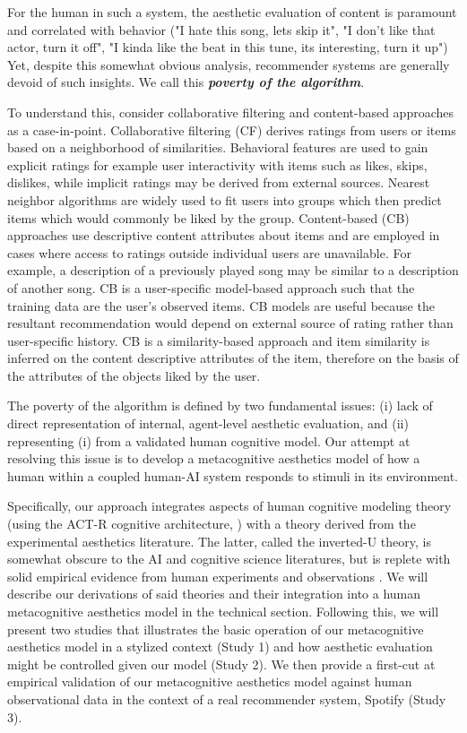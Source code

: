 \documentclass[letterpaper]{article} %
\begin{document}
For the human in such a system, the aesthetic evaluation of content is paramount and correlated with behavior ("I hate this song, lets skip it", "I don't like that actor, turn it off", "I kinda like the beat in this tune, its interesting, turn it up")  Yet, despite this somewhat obvious analysis, recommender systems are generally devoid of such insights.  We call this \textbf{\textit{poverty of the algorithm}}.  

To understand this, consider collaborative filtering and content-based approaches as a case-in-point.  Collaborative filtering (CF) derives ratings from users or items based on a neighborhood of similarities. Behavioral features are used to gain explicit ratings for example user interactivity with items such as likes, skips, dislikes, while implicit ratings may be derived from external sources.  Nearest neighbor algorithms are widely used to fit users into groups which then predict items which would commonly be liked by the group.  Content-based (CB) approaches use descriptive content attributes about items and are employed in cases where access to ratings outside individual users are unavailable. For example, a description of a previously played song may be similar to a description of another song. CB is a user-specific model-based approach such that the training data are the user’s observed items.  CB models are useful because the resultant recommendation would depend on external source of rating rather than user-specific history.  CB is a similarity-based approach and item similarity is inferred on the content descriptive attributes of the item, therefore on the basis of the attributes of the objects liked by the user. 

The poverty of the algorithm is defined by two fundamental issues: (i) lack of direct representation of internal, agent-level aesthetic evaluation, and (ii) representing (i) from a validated human cognitive model.  Our attempt at resolving this issue is to develop a metacognitive aesthetics model of how a human within a coupled human-AI system responds to stimuli in its environment.

Specifically, our approach integrates aspects of human cognitive modeling theory (using the ACT-R cognitive architecture, \cite{AndersonBothellByrneDouglassLebiereQin2004}) with a theory derived from the experimental aesthetics literature.  The latter, called the inverted-U theory, is somewhat obscure to the AI and cognitive science literatures, but is replete with solid empirical evidence from human experiments and observations \cite{berlyne1974studies,chmiel2017back}. We will describe our derivations of said theories and their integration into a human metacognitive aesthetics model in the technical section.  Following this, we will present two studies that illustrates the basic operation of our metacognitive aesthetics model in a stylized context (Study 1) and how aesthetic evaluation might be controlled given our model (Study 2).  We then provide a first-cut at empirical validation of our metacognitive aesthetics model against human observational data in the context of a real recommender system, Spotify (Study 3). 
\end{document}
